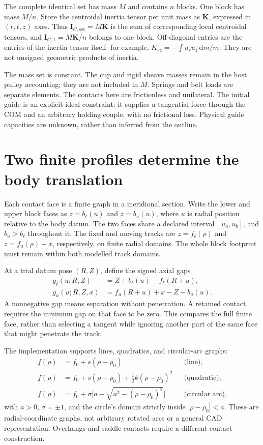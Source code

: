 \documentclass[11pt,letterpaper]{article}
\numberwithin{equation}{section}
\newcommand{\half}{\tfrac12}
\newcommand{\dd}{\mathrm d}
\begin{document}
The complete identical set has mass $M$ and contains $n$ blocks. One block has
mass $M/n$. Store the centroidal inertia tensor per unit mass as $\bm K$,
expressed in $(r,t,z)$ axes. Thus $\bm I_{C,\mathrm{set}}=M\bm K$ is the sum of
corresponding local centroidal tensors, and $\bm I_{C,1}=M\bm K/n$ belongs to
one block. Off-diagonal entries are the entries of the inertia tensor itself:
for example, $K_{rz}=-\int u_r u_z\,\dd m/m$. They are not unsigned geometric
products of inertia.

The mass set is constant. The cup and rigid sheave masses remain in the host
pulley accounting; they are not included in $M$. Springs and belt loads are
separate elements. The contacts here are frictionless and unilateral. The
initial guide is an explicit ideal constraint: it supplies a tangential force
through the COM and an arbitrary holding couple, with no frictional loss.
Physical guide capacities are unknown, rather than inferred from the outline.

\section{Two finite profiles determine the body translation}
\label{sec:contacts}

Each contact face is a finite graph in a meridional section. Write the lower
and upper block faces as $z=b_\ell(u)$ and $z=b_u(u)$, where $u$ is radial
position relative to the body datum. The two faces share a declared interval
$[u_a,u_b]$, and $b_u>b_\ell$ throughout it. The fixed and moving tracks are
$z=f_\ell(\rho)$ and $z=f_u(\rho)+x$, respectively, on finite radial domains.
The whole block footprint must remain within both modelled track domains.

At a trial datum pose $(R,Z)$, define the signed axial gaps
\begin{align}
 g_\ell(u;R,Z)&=Z+b_\ell(u)-f_\ell(R+u),\\
 g_u(u;R,Z,x)&=f_u(R+u)+x-Z-b_u(u).
\end{align}
A nonnegative gap means separation without penetration. A retained contact
requires the minimum gap on that face to be zero. This compares the full
finite face, rather than selecting a tangent while ignoring another part of
the same face that might penetrate the track.

The implementation supports lines, quadratics, and circular-arc graphs:
\begin{align}
 f(\rho)&=f_0+s(\rho-\rho_0) &&\text{(line)},\\
 f(\rho)&=f_0+s(\rho-\rho_0)+\half k(\rho-\rho_0)^2
                &&\text{(quadratic)},\\
 f(\rho)&=f_0+\sigma\bigl[a-\sqrt{a^2-(\rho-\rho_0)^2}\bigr]
                &&\text{(circular arc)},
\end{align}
with $a>0$, $\sigma=\pm1$, and the circle's domain strictly inside
$|\rho-\rho_0|<a$. These are radial-coordinate graphs, not arbitrary rotated
arcs or a general CAD representation. Overhangs and saddle contacts require a
different contact construction.
\end{document}
